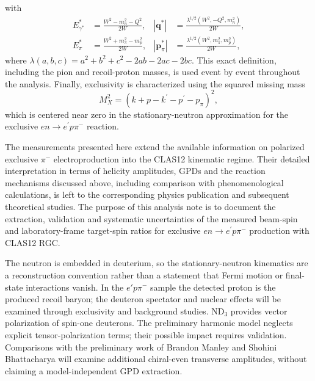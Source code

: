 with
\begin{align}
    E_{\gamma^*}^* &= \frac{W^2-m_n^2-Q^2}{2W},
    &
    |\mathbf{q}^*| &= \frac{\lambda^{1/2}(W^2,-Q^2,m_n^2)}{2W},
    \\
    E_{\pi}^* &= \frac{W^2+m_{\pi}^2-m_p^2}{2W},
    &
    |\mathbf{p}_{\pi}^*| &= \frac{\lambda^{1/2}(W^2,m_{\pi}^2,m_p^2)}{2W},
\end{align}
where $\lambda(a,b,c)=a^2+b^2+c^2-2ab-2ac-2bc$. This exact definition, including the pion and recoil-proton masses, is used event by event throughout the analysis. Finally, exclusivity is characterized using the squared missing mass
\begin{equation}
    M_X^2=(k+p-k^\prime-p^\prime-p_\pi)^2,
\end{equation}
which is centered near zero in the stationary-neutron approximation for the exclusive $en\rightarrow e^\prime p\pi^-$ reaction.

The measurements presented here extend the available information on polarized exclusive $\pi^-$ electroproduction into the CLAS12 kinematic regime. Their detailed interpretation in terms of helicity amplitudes, GPDs and the reaction mechanisms discussed above, including comparison with phenomenological calculations, is left to the corresponding physics publication and subsequent theoretical studies. The purpose of this analysis note is to document the extraction, validation and systematic uncertainties of the measured beam-spin and laboratory-frame target-spin ratios for exclusive $en\rightarrow e^\prime p\pi^-$ production with CLAS12 RGC.

The neutron is embedded in deuterium, so the stationary-neutron kinematics are a reconstruction convention rather than a statement that Fermi motion or final-state interactions vanish. In the $e'p\pi^-$ sample the detected proton is the produced recoil baryon; the deuteron spectator and nuclear effects will be examined through exclusivity and background studies. ND$_3$ provides vector polarization of spin-one deuterons. The preliminary harmonic model neglects explicit tensor-polarization terms; their possible impact requires validation. Comparisons with the preliminary work of Brandon Manley and Shohini Bhattacharya will examine additional chiral-even transverse amplitudes, without claiming a model-independent GPD extraction.
